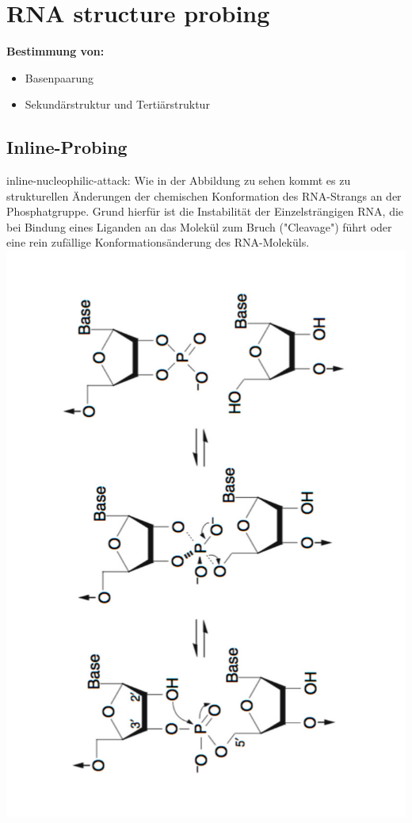 \section{RNA structure probing}
\textbf{Bestimmung von:}
\begin{itemize}
\item Basenpaarung
\item Sekundärstruktur und Tertiärstruktur
\end{itemize}

\subsection{Inline-Probing}
inline-nucleophilic-attack: Wie in der Abbildung zu sehen kommt es zu strukturellen Änderungen der chemischen Konformation des RNA-Strangs an der Phosphatgruppe. Grund hierfür ist die Instabilität der Einzelsträngigen RNA, die bei Bindung eines Liganden an das Molekül zum Bruch ("Cleavage") führt oder eine rein zufällige Konformationsänderung des RNA-Moleküls. \\
\includegraphics[scale=0.25,angle=270]{lectures/160527/pix/inline.jpg}

